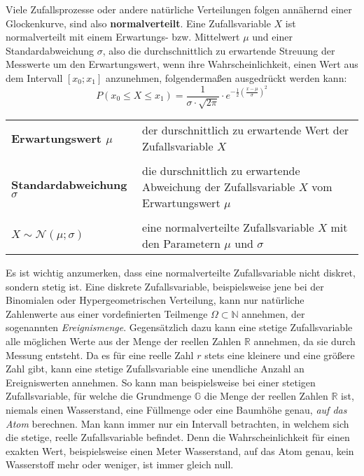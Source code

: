 



\thispagestyle{plain}


Viele Zufallsprozesse oder andere nat\"{u}rliche Verteilungen folgen ann\"{a}hernd einer Glockenkurve, sind also \textbf{normalverteilt}. Eine Zufallsvariable $X$ ist normalverteilt mit einem Erwartungs- bzw. Mittelwert $\mu$ und einer Standardabweichung $\sigma$, also die durchschnittlich zu erwartende Streuung der Messwerte um den Erwartungswert, wenn ihre Wahrscheinlichkeit, einen Wert aus dem Intervall $[x_{0} ; x_{1}]$ anzunehmen, folgenderma\ss{}en ausgedr\"{u}ckt werden kann: $$P(x_{0} \leq X \leq x_{1}) = \frac{1}{\sigma \cdot \sqrt{2\pi}} \cdot e^{-\frac{1}{2}\left(\frac{x - \mu}{\sigma}\right)^2}$$

\begin{tabular}{l p{11cm}}
	\textbf{Erwartungswert $\mu$} &  der durschnittlich zu erwartende Wert der Zufallsvariable $X$
	\\ & \\
	\textbf{Standardabweichung $\sigma$} &  die durschnittlich zu erwartende Abweichung der Zufallsvariable $X$ vom Erwartungswert $\mu$
	\\ & \\
	\textbf{$X \sim \mathcal{N}(\mu; \sigma)$} &  eine normalverteilte Zufallsvariable $X$ mit den Parametern $\mu$ und $\sigma$
\end{tabular}

Es ist wichtig anzumerken, dass eine normalverteilte Zufallsvariable nicht diskret, sondern stetig ist. Eine diskrete Zufallsvariable, beispielsweise jene bei der Binomialen oder Hypergeometrischen Verteilung, kann nur nat\"{u}rliche Zahlenwerte aus einer vordefinierten Teilmenge $\Omega \subset \mathbb{N}$ annehmen, der sogenannten \emph{Ereignismenge}. Gegens\"{a}tzlich dazu kann eine stetige Zufallsvariable alle m\"{o}glichen Werte aus der Menge der reellen Zahlen $\mathbb{R}$ annehmen, da sie durch Messung entsteht. Da es f\"{u}r eine reelle Zahl $r$ stets eine kleinere und eine gr\"{o}\ss{}ere Zahl gibt, kann eine stetige Zufallsvariable eine unendliche Anzahl an Ereigniswerten annehmen. So kann man beispielsweise bei einer stetigen Zufallsvariable, f\"{u}r welche die Grundmenge $\mathbb{G}$ die Menge der reellen Zahlen $\mathbb{R}$ ist, niemals einen Wasserstand, eine F\"{u}llmenge oder eine Baumh\"{o}he genau, \emph{auf das Atom} berechnen. Man kann immer nur ein Intervall betrachten, in welchem sich die stetige, reelle Zufallsvariable befindet. Denn die Wahrscheinlichkeit f\"{u}r einen exakten Wert, beispielsweise einen Meter Wasserstand, auf das Atom genau, kein Wasserstoff mehr oder weniger, ist immer gleich null. 

